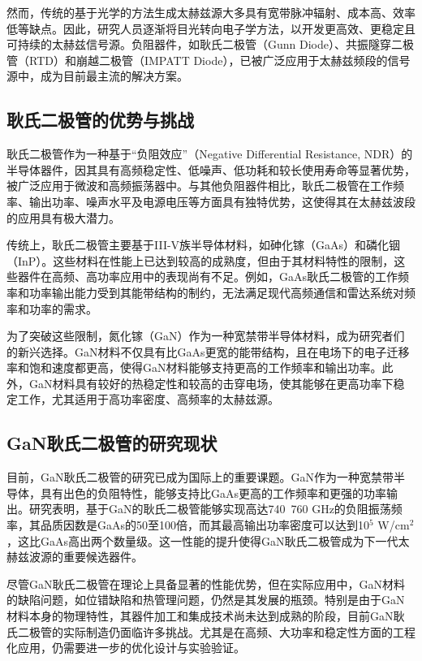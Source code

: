 \documentclass[12pt,hyperref,a4paper,UTF8]{ctexart}
\begin{document}
然而，传统的基于光学的方法生成太赫兹源大多具有宽带脉冲辐射、成本高、效率低等缺点。因此，研究人员逐渐将目光转向电子学方法，以开发更高效、更稳定且可持续的太赫兹信号源。负阻器件，如耿氏二极管（Gunn Diode）、共振隧穿二极管（RTD）和崩越二极管（IMPATT Diode），已被广泛应用于太赫兹频段的信号源中，成为目前最主流的解决方案。

\subsection*{耿氏二极管的优势与挑战}

耿氏二极管作为一种基于“负阻效应”（Negative Differential Resistance, NDR）的半导体器件，因其具有高频稳定性、低噪声、低功耗和较长使用寿命等显著优势，被广泛应用于微波和高频振荡器中。与其他负阻器件相比，耿氏二极管在工作频率、输出功率、噪声水平及电源电压等方面具有独特优势，这使得其在太赫兹波段的应用具有极大潜力。

传统上，耿氏二极管主要基于III-V族半导体材料，如砷化镓（GaAs）和磷化铟（InP）。这些材料在性能上已达到较高的成熟度，但由于其材料特性的限制，这些器件在高频、高功率应用中的表现尚有不足。例如，GaAs耿氏二极管的工作频率和功率输出能力受到其能带结构的制约，无法满足现代高频通信和雷达系统对频率和功率的需求。

为了突破这些限制，氮化镓（GaN）作为一种宽禁带半导体材料，成为研究者们的新兴选择。GaN材料不仅具有比GaAs更宽的能带结构，且在电场下的电子迁移率和饱和速度都更高，使得GaN材料能够支持更高的工作频率和输出功率。此外，GaN材料具有较好的热稳定性和较高的击穿电场，使其能够在更高功率下稳定工作，尤其适用于高功率密度、高频率的太赫兹源。

\subsection*{GaN耿氏二极管的研究现状}

目前，GaN耿氏二极管的研究已成为国际上的重要课题。GaN作为一种宽禁带半导体，具有出色的负阻特性，能够支持比GaAs更高的工作频率和更强的功率输出。研究表明，基于GaN的耿氏二极管能够实现高达740~760 GHz的负阻振荡频率，其品质因数是GaAs的50至100倍，而其最高输出功率密度可以达到10$^{5}$ W/cm$^2$，这比GaAs高出两个数量级。这一性能的提升使得GaN耿氏二极管成为下一代太赫兹波源的重要候选器件。

尽管GaN耿氏二极管在理论上具备显著的性能优势，但在实际应用中，GaN材料的缺陷问题，如位错缺陷和热管理问题，仍然是其发展的瓶颈。特别是由于GaN材料本身的物理特性，其器件加工和集成技术尚未达到成熟的阶段，目前GaN耿氏二极管的实际制造仍面临许多挑战。尤其是在高频、大功率和稳定性方面的工程化应用，仍需要进一步的优化设计与实验验证。
\end{document}
